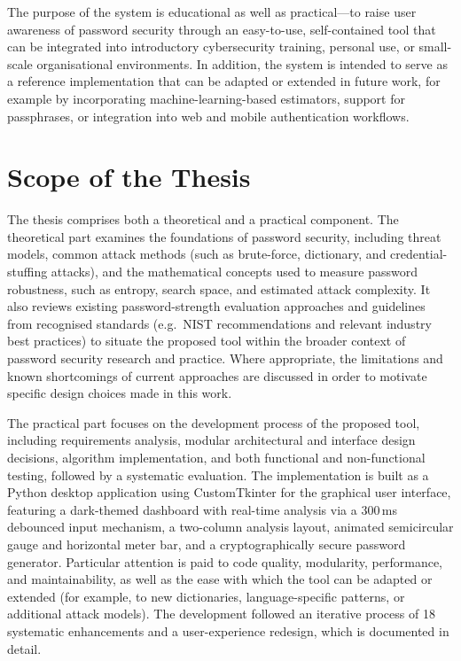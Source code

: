 The purpose of the system is educational as well as practical---to raise user awareness of password security through an easy-to-use, self-contained tool that can be integrated into introductory cybersecurity training, personal use, or small-scale organisational environments. In addition, the system is intended to serve as a reference implementation that can be adapted or extended in future work, for example by incorporating machine-learning-based estimators, support for passphrases, or integration into web and mobile authentication workflows.


\section{Scope of the Thesis}

The thesis comprises both a theoretical and a practical component. The theoretical part examines the foundations of password security, including threat models, common attack methods (such as brute-force, dictionary, and credential-stuffing attacks), and the mathematical concepts used to measure password robustness, such as entropy, search space, and estimated attack complexity. It also reviews existing password-strength evaluation approaches and guidelines from recognised standards (e.g.\ NIST recommendations and relevant industry best practices) to situate the proposed tool within the broader context of password security research and practice. Where appropriate, the limitations and known shortcomings of current approaches are discussed in order to motivate specific design choices made in this work.

The practical part focuses on the development process of the proposed tool, including requirements analysis, modular architectural and interface design decisions, algorithm implementation, and both functional and non-functional testing, followed by a systematic evaluation. The implementation is built as a Python desktop application using CustomTkinter for the graphical user interface, featuring a dark-themed dashboard with real-time analysis via a 300\,ms debounced input mechanism, a two-column analysis layout, animated semicircular gauge and horizontal meter bar, and a cryptographically secure password generator. Particular attention is paid to code quality, modularity, performance, and maintainability, as well as the ease with which the tool can be adapted or extended (for example, to new dictionaries, language-specific patterns, or additional attack models). The development followed an iterative process of 18 systematic enhancements and a user-experience redesign, which is documented in detail.

